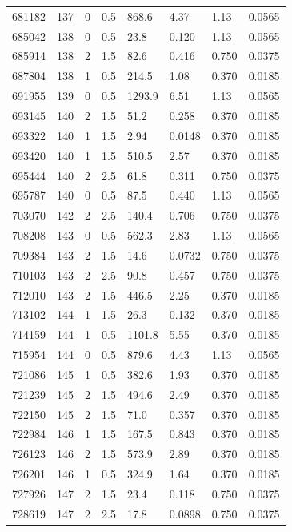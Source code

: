 \documentclass[preview]{standalone}
\begin{document}
{{{{{{{{{\begin{tabular}{L{1.2cm}C{1.2cm} C{0.3cm}C{0.5cm} C{1.4cm}C{1.4cm} C{1.4cm}C{1.4cm}}
  681182  &   137  & 0     & 0.5 &  868.6  & 4.37  & 1.13 &  0.0565   \\ 
  685042  &   138  & 0     & 0.5 &  23.8  & 0.120  & 1.13 &  0.0565   \\ 
  685914  &   138  & 2     & 1.5 &  82.6  & 0.416  & 0.750 &  0.0375   \\ 
  687804  &   138  & 1     & 0.5 &  214.5  & 1.08  & 0.370 &  0.0185   \\ 
  691955  &   139  & 0     & 0.5 &  1293.9  & 6.51  & 1.13 &  0.0565   \\ 
  693145  &   140  & 2     & 1.5 &  51.2  & 0.258  & 0.370 &  0.0185   \\ 
  693322  &   140  & 1     & 1.5 &  2.94  & 0.0148  & 0.370 &  0.0185   \\ 
  693420  &   140  & 1     & 1.5 &  510.5  & 2.57  & 0.370 &  0.0185   \\ 
  695444  &   140  & 2     & 2.5 &  61.8  & 0.311  & 0.750 &  0.0375   \\ 
  695787  &   140  & 0     & 0.5 &  87.5  & 0.440  & 1.13 &  0.0565   \\ 
  703070  &   142  & 2     & 2.5 &  140.4  & 0.706  & 0.750 &  0.0375   \\ 
  708208  &   143  & 0     & 0.5 &  562.3  & 2.83  & 1.13 &  0.0565   \\ 
  709384  &   143  & 2     & 1.5 &  14.6  & 0.0732  & 0.750 &  0.0375   \\ 
  710103  &   143  & 2     & 2.5 &  90.8  & 0.457  & 0.750 &  0.0375   \\ 
  712010  &   143  & 2     & 1.5 &  446.5  & 2.25  & 0.370 &  0.0185   \\ 
  713102  &   144  & 1     & 1.5 &  26.3  & 0.132  & 0.370 &  0.0185   \\ 
  714159  &   144  & 1     & 0.5 &  1101.8  & 5.55  & 0.370 &  0.0185   \\ 
  715954  &   144  & 0     & 0.5 &  879.6  & 4.43  & 1.13 &  0.0565   \\ 
  721086  &   145  & 1     & 0.5 &  382.6  & 1.93  & 0.370 &  0.0185   \\ 
  721239  &   145  & 2     & 1.5 &  494.6  & 2.49  & 0.370 &  0.0185   \\ 
  722150  &   145  & 2     & 1.5 &  71.0  & 0.357  & 0.370 &  0.0185   \\ 
  722984  &   146  & 1     & 1.5 &  167.5  & 0.843  & 0.370 &  0.0185   \\ 
  726123  &   146  & 2     & 1.5 &  573.9  & 2.89  & 0.370 &  0.0185   \\ 
  726201  &   146  & 1     & 0.5 &  324.9  & 1.64  & 0.370 &  0.0185   \\ 
  727926  &   147  & 2     & 1.5 &  23.4  & 0.118  & 0.750 &  0.0375   \\ 
  728619  &   147  & 2     & 2.5 &  17.8  & 0.0898  & 0.750 &  0.0375   \\ 
\hline 
\end{tabular} 

}}}}}}}}}
\end{document}
